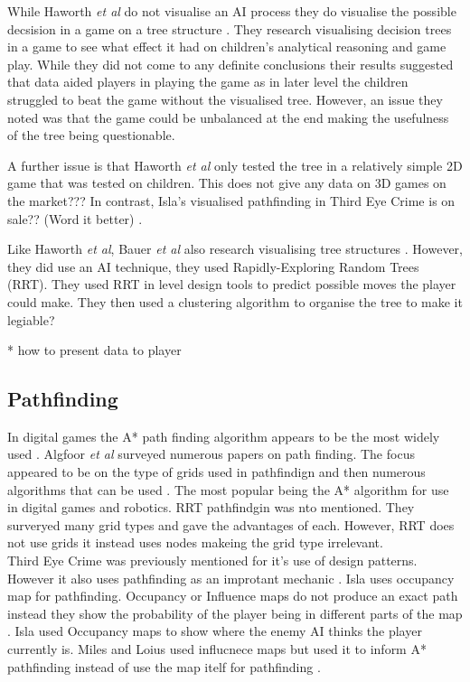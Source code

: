 \documentclass[journal]{IEEEtran}
\begin{document}
While Haworth \textit{et al} do not visualise an AI process they do visualise the possible decsision in a game on a tree structure \cite{Haworth2010}. They research visualising decision trees in a game to see what effect it had on children's analytical reasoning and game play.  While they did not come to any definite conclusions their results suggested that data aided players in playing the game as in later level the children struggled to beat the game without the visualised tree. However, an issue they noted was that the game could be unbalanced at the end making the usefulness of the tree being questionable.  

A further issue is that Haworth \textit{et al} only tested the tree in a relatively simple 2D game that was tested on children. This does not give any data on 3D games on the market??? In contrast, Isla's visualised pathfinding in Third Eye Crime is on sale?? (Word it better) \cite{Isla2014}.
 
Like  Haworth \textit{et al}, Bauer \textit{et al} also research visualising tree structures \cite{bauer2012}. However, they did use an AI technique, they used Rapidly-Exploring Random Trees (RRT). They used RRT in level design tools to predict possible moves the player could make.  They then used a clustering algorithm to organise the tree to make it legiable? 

* how to present data to player 


\subsection{Pathfinding}
In digital games the A* path finding algorithm appears to be the most widely used \cite{Algfoor2015}.  Algfoor \textit{et al} surveyed numerous papers on path finding. The focus appeared to be on the type of grids used in pathfindign and then numerous algorithms that can be used \cite{Algfoor2015}. The most popular being the A* algorithm for use in digital games and robotics. RRT pathfindgin was nto mentioned. 
They surveryed many grid types and gave the advantages of each. However, RRT does not use grids it instead uses nodes makeing the grid type irrelevant.\\

Third Eye Crime was previously mentioned for it's use of design patterns. However it also uses pathfinding as an improtant mechanic \cite{Isla2014}. Isla uses occupancy map for pathfinding. Occupancy or Influence maps do not produce an exact path instead they show the probability of the player being in different parts of the map \cite{Isla2014, Miles2006}. Isla used Occupancy maps to show where the enemy AI thinks the player currently is. Miles and Loius used influcnece maps but used it to inform A* pathfinding instead of use the map itelf for pathfinding \cite{Miles2006}.\\
 
\end{document}
